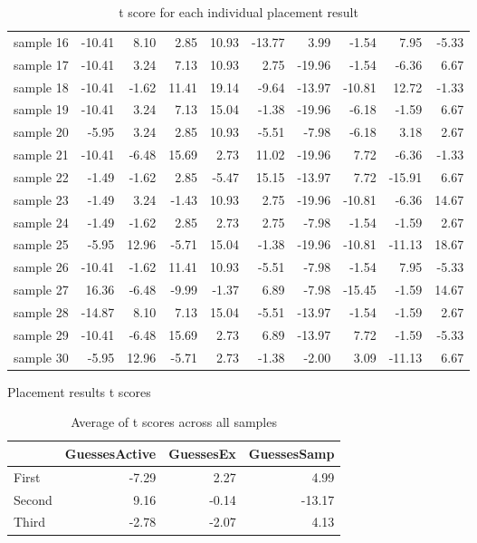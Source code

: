 \begin{table}
\begin{tabular}{lrrrrrrrrr}
sample 16 &        -10.41 &   8.10 &   2.85 &     10.93 & -13.77 &   3.99 &       -1.54 &   7.95 &  -5.33 \\
sample 17 &        -10.41 &   3.24 &   7.13 &     10.93 &   2.75 & -19.96 &       -1.54 &  -6.36 &   6.67 \\
sample 18 &        -10.41 &  -1.62 &  11.41 &     19.14 &  -9.64 & -13.97 &      -10.81 &  12.72 &  -1.33 \\
sample 19 &        -10.41 &   3.24 &   7.13 &     15.04 &  -1.38 & -19.96 &       -6.18 &  -1.59 &   6.67 \\
sample 20 &         -5.95 &   3.24 &   2.85 &     10.93 &  -5.51 &  -7.98 &       -6.18 &   3.18 &   2.67 \\
sample 21 &        -10.41 &  -6.48 &  15.69 &      2.73 &  11.02 & -19.96 &        7.72 &  -6.36 &  -1.33 \\
sample 22 &         -1.49 &  -1.62 &   2.85 &     -5.47 &  15.15 & -13.97 &        7.72 & -15.91 &   6.67 \\
sample 23 &         -1.49 &   3.24 &  -1.43 &     10.93 &   2.75 & -19.96 &      -10.81 &  -6.36 &  14.67 \\
sample 24 &         -1.49 &  -1.62 &   2.85 &      2.73 &   2.75 &  -7.98 &       -1.54 &  -1.59 &   2.67 \\
sample 25 &         -5.95 &  12.96 &  -5.71 &     15.04 &  -1.38 & -19.96 &      -10.81 & -11.13 &  18.67 \\
sample 26 &        -10.41 &  -1.62 &  11.41 &     10.93 &  -5.51 &  -7.98 &       -1.54 &   7.95 &  -5.33 \\
sample 27 &         16.36 &  -6.48 &  -9.99 &     -1.37 &   6.89 &  -7.98 &      -15.45 &  -1.59 &  14.67 \\
sample 28 &        -14.87 &   8.10 &   7.13 &     15.04 &  -5.51 & -13.97 &       -1.54 &  -1.59 &   2.67 \\
sample 29 &        -10.41 &  -6.48 &  15.69 &      2.73 &   6.89 & -13.97 &        7.72 &  -1.59 &  -5.33 \\
sample 30 &         -5.95 &  12.96 &  -5.71 &      2.73 &  -1.38 &  -2.00 &        3.09 & -11.13 &   6.67 \\
\bottomrule
\end{tabular}
\caption{Placement results t scores}
\caption*{t score for each individual placement result}
\end{table}


\begin{table}
\begin{tabular}{lrrr}
\toprule
{} &  GuessesActive &  GuessesEx &  GuessesSamp \\
\midrule
First  &      -7.29 &       2.27 &         4.99 \\
Second &       9.16 &      -0.14 &       -13.17 \\
Third  &      -2.78 &      -2.07 &         4.13 \\
\bottomrule
\end{tabular}
\caption{Average of t scores across all samples}
\end{table}
